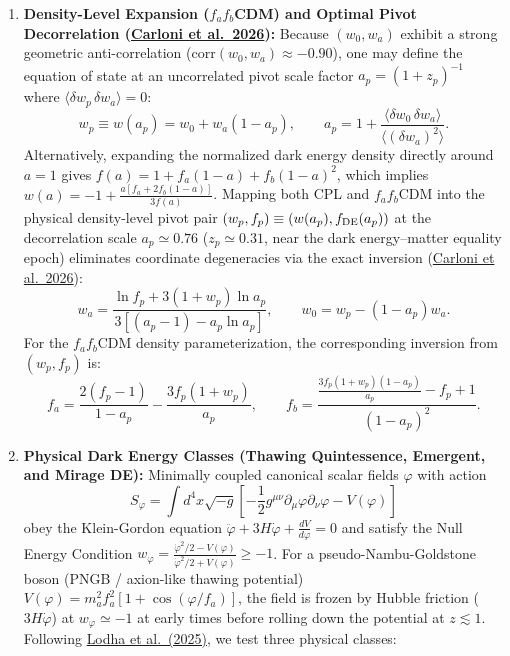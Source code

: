 \documentclass[aps,prd,preprint,superscriptaddress,nofootinbib]{revtex4-2}
\begin{document}
\begin{enumerate}
    \item \textbf{Density-Level Expansion ($f_a f_b$CDM) and Optimal Pivot Decorrelation (\href{https://arxiv.org/pdf/2608.01215}{Carloni et al.\ 2026}):} Because $(w_0, w_a)$ exhibit a strong geometric anti-correlation ($\text{corr}(w_0, w_a) \approx -0.90$), one may define the equation of state at an uncorrelated pivot scale factor $a_p = (1 + z_p)^{-1}$ where $\langle \delta w_p\, \delta w_a \rangle = 0$:
    \begin{equation}
        w_p \equiv w(a_p) = w_0 + w_a (1 - a_p), \qquad a_p = 1 + \frac{\langle \delta w_0\, \delta w_a \rangle}{\langle (\delta w_a)^2 \rangle}.
        \label{m:eq:pivot_wp}
    \end{equation}
    Alternatively, expanding the normalized dark energy density directly around $a=1$ gives $f(a) = 1 + f_a(1-a) + f_b(1-a)^2$, which implies $w(a) = -1 + \frac{a[f_a + 2f_b(1-a)]}{3f(a)}$. Mapping both CPL and $f_a f_b$CDM into the physical density-level pivot pair $(w_p, f_p) \equiv (w(a_p), f_{\rm DE}(a_p))$ at the decorrelation scale $a_p \simeq 0.76$ ($z_p \simeq 0.31$, near the dark energy--matter equality epoch) eliminates coordinate degeneracies via the exact inversion (\href{https://arxiv.org/pdf/2608.01215}{Carloni et al.\ 2026}):
    \begin{equation}
        w_a = \frac{\ln f_p + 3(1 + w_p)\ln a_p}{3\left[(a_p - 1) - a_p \ln a_p\right]}, \qquad w_0 = w_p - (1 - a_p)w_a.
        \label{m:eq:pivot_density}
    \end{equation}
    For the $f_a f_b$CDM density parameterization, the corresponding inversion from $(w_p, f_p)$ is:
    \begin{equation}
        f_a = \frac{2(f_p - 1)}{1 - a_p} - \frac{3 f_p (1 + w_p)}{a_p}, \qquad f_b = \frac{\frac{3 f_p (1 + w_p)(1 - a_p)}{a_p} - f_p + 1}{(1 - a_p)^2}.
        \label{m:eq:fafb_inversion}
    \end{equation}
    \item \textbf{Physical Dark Energy Classes (Thawing Quintessence, Emergent, and Mirage DE):} Minimally coupled canonical scalar fields $\varphi$ with action
    \begin{equation}
        S_\varphi = \int d^4x \sqrt{-g} \left[ -\frac{1}{2}g^{\mu\nu}\partial_\mu\varphi\partial_\nu\varphi - V(\varphi) \right]
        \label{m:eq:quintessence_action}
    \end{equation}
    obey the Klein-Gordon equation $\ddot{\varphi} + 3H\dot{\varphi} + \frac{dV}{d\varphi} = 0$ and satisfy the Null Energy Condition $w_\varphi = \frac{\dot{\varphi}^2/2 - V(\varphi)}{\dot{\varphi}^2/2 + V(\varphi)} \ge -1$. For a pseudo-Nambu-Goldstone boson (PNGB / axion-like thawing potential) $V(\varphi) = m_a^2 f_a^2 [1 + \cos(\varphi/f_a)]$, the field is frozen by Hubble friction ($3H\dot{\varphi}$) at $w_\varphi \simeq -1$ at early times before rolling down the potential at $z \lesssim 1$. Following \href{https://arxiv.org/abs/2503.14743}{Lodha et al.\ (2025)}, we test three physical classes:

\end{enumerate}
\end{document}
